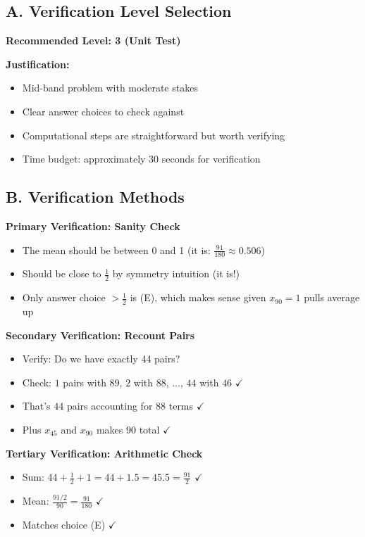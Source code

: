 \documentclass[12pt]{article}
\begin{document}
\begin{verificationbox}
\subsection*{A. Verification Level Selection}

\textbf{Recommended Level: 3 (Unit Test)}

\textbf{Justification:}
\begin{itemize}
    \item Mid-band problem with moderate stakes
    \item Clear answer choices to check against
    \item Computational steps are straightforward but worth verifying
    \item Time budget: approximately 30 seconds for verification
\end{itemize}

\subsection*{B. Verification Methods}

\textbf{Primary Verification: Sanity Check}
\begin{itemize}
    \item The mean should be between 0 and 1 (it is: $\frac{91}{180} \approx 0.506$)
    \item Should be close to $\frac{1}{2}$ by symmetry intuition (it is!)
    \item Only answer choice $> \frac{1}{2}$ is (E), which makes sense given $x_{90} = 1$ pulls average up
\end{itemize}

\textbf{Secondary Verification: Recount Pairs}
\begin{itemize}
    \item Verify: Do we have exactly 44 pairs?
    \item Check: $1$ pairs with $89$, $2$ with $88$, $\ldots$, $44$ with $46$ $\checkmark$
    \item That's $44$ pairs accounting for $88$ terms $\checkmark$
    \item Plus $x_{45}$ and $x_{90}$ makes $90$ total $\checkmark$
\end{itemize}

\textbf{Tertiary Verification: Arithmetic Check}
\begin{itemize}
    \item Sum: $44 + \frac{1}{2} + 1 = 44 + 1.5 = 45.5 = \frac{91}{2}$ $\checkmark$
    \item Mean: $\frac{91/2}{90} = \frac{91}{180}$ $\checkmark$
    \item Matches choice (E) $\checkmark$
\end{itemize}


\end{verificationbox}
\end{document}
